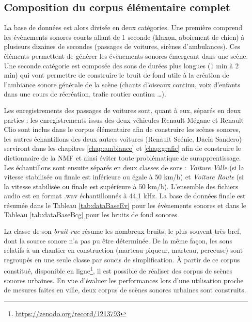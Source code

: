 \subsection{Composition du corpus élémentaire complet}

La base de données est alors divisée en deux catégories. Une première comprend les évènements sonores courts allant de 1 seconde (klaxon, aboiement de chien) à plusieurs dizaines de secondes (passages de voitures, sirènes d'ambulances). Ces éléments permettent de générer les évènements sonores émergeant dans une scène. Une seconde catégorie est composée des sons de durées plus longues (1 min à 2 min) qui vont permettre de construire le bruit de fond utile à la création de l'ambiance sonore générale de la scène (chants d'oiseaux continu, voix d'enfants dans une cours de récréation, trafic routier continu \dots).

Les enregistrements des passages de voitures sont, quant à eux, séparés en deux parties : les enregistrements issus des deux  véhicules Renault Mégane et Renault Clio sont inclus dans le corpus élémentaire afin de construire les scènes sonores, les autres échantillons des deux autres voitures (Renault Scénic, Dacia Sandero) serviront dans les chapitres \ref{chap:ambiance} et \ref{chap:grafic} afin de construire le dictionnaire de la NMF et ainsi éviter toute problématique de surapprentissage.
Les échantillons sont ensuite séparés en deux classes de sons : \textit{Voiture Ville} (si la vitesse stabilisée ou finale est inférieure ou égale à 50 km/h) et \textit{Voiture Route} (si la vitesse stabilisée ou finale est supérieure à 50 km/h). L'ensemble des fichiers audio est en format .wav échantillonnés à 44,1 kHz. La base de données finale est résumée dans le Tableau \ref{tab:dataBaseEv} pour les évènements sonores et dans le Tableau \ref{tab:dataBaseBcg} pour les bruits de fond sonores.



La classe de son \textit{bruit rue} résume les nombreux bruits, le plus souvent très bref, dont la source sonore n'a pas pu être déterminée. De la même façon, les sons relatifs à un chantier en construction (marteau-piqueur, marteau, perceuse) sont regroupés en une seule classe par soucis de simplification.
À partir de ce corpus constitué, disponible en ligne\footnote{\url{https://zenodo.org/record/1213793}}, il est possible de réaliser des corpus de scènes sonores urbaines. En vue d'évaluer les performances lors d'une utilisation proche de mesures faites en ville, deux corpus de scènes sonores urbaines sont construits.

